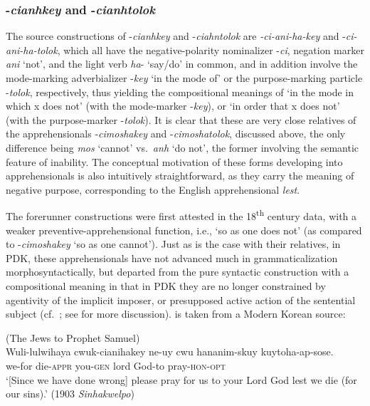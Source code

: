 \documentclass[output=paper,colorlinks,citecolor=brown]{langscibook}
\begin{document}
\subsubsection{-\textit{cianhkey} and -\textit{cianhtolok}}

The source constructions of \nobreakdash-\textit{cianhkey} and \nobreakdash-\textit{ciahntolok} are \textit{-ci-ani-ha-key} and  \nobreakdash-\textit{ci-ani-ha-tolok}, which all have the negative-polarity nominalizer \nobreakdash-\textit{ci}, negation marker \textit{ani} `not', and the light verb \textit{ha}- `say/do' in common, and in addition involve the mode-marking adverbializer \nobreakdash-\textit{key} `in the mode of' or the purpose-marking particle \nobreakdash-\textit{tolok}, respectively, thus yielding the compositional meanings of `in the mode in which x does not' (with the mode-marker \nobreakdash-\textit{key}), or `in order that x does not' (with the purpose-marker \nobreakdash-\textit{tolok}). It is clear that these are very close relatives of the apprehensionals \nobreakdash-\textit{cimoshakey} and \nobreakdash-\textit{cimoshatolok}, discussed above, the only difference being \textit{mos} `cannot' vs.\ \textit{anh} `do not', the former involving the semantic feature of inability. The conceptual motivation of these forms developing into apprehensionals is also intuitively straightforward, as they carry the meaning of negative purpose, corresponding to the English apprehensional \textit{lest}.

The forerunner constructions were first attested in the 18\textsuperscript{th} century data, with a weaker preventive-apprehensional function, i.e., `so as one does not' (as compared to \nobreakdash-\textit{cimoshakey} `so as one cannot'). Just as is the case with their relatives, in PDK, these apprehensionals have not advanced much in grammaticalization morphosyntactically, but departed from the pure syntactic construction with a compositional meaning in that in PDK they are no longer constrained by agentivity of the implicit imposer, or presupposed active action of the sentential subject (cf.\ ; see  for more discussion).  is taken from a Modern Korean source:


\ea \label{ex:RK15} \textnormal{(The Jews to Prophet Samuel)}\\
\gll Wuli-lulwihaya cwuk-cianihakey ne-uy cwu hananim-skuy kuytoha-ap-sose. \\
we-for die-\textsc{appr} you-\textsc{gen} lord God-to pray-\textsc{hon}-\textsc{opt} \\
\glt `[Since we have done wrong] please pray for us to your Lord God lest we die (for our sins).' (1903 \textit{Sinhakwelpo})
\z
\end{document}
